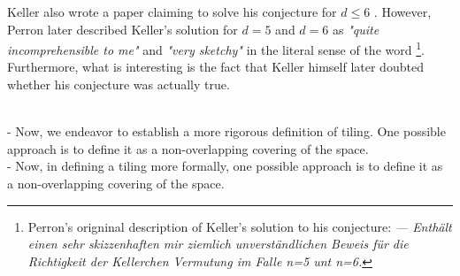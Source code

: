 \documentclass[../thesis.tex]{subfiles}
\begin{document}
\begin{remark}
    Keller also wrote a paper claiming to solve his conjecture for $d\leq 6$ \cite{Keller1937}. However, Perron later described Keller's solution for $d=5$ and $d=6$ as \emph{"quite incomprehensible to me"} and \emph{"very sketchy"} in the literal sense of the word \cite{perronUeberLueckenloseAusfuellung1940} \footnote[1]{Perron's origninal description of Keller's solution to his conjecture: \emph{— Enthält einen sehr skizzenhaften mir ziemlich unverständlichen Beweis für die Richtigkeit der Kellerchen Vermutung im Falle n=5 unt n=6.}}. Furthermore, what is interesting is the fact that Keller himself later doubted whether his conjecture was actually true.
\end{remark}
\\
- Now, we endeavor to establish a more rigorous definition of tiling. One possible approach is to define it as a non-overlapping covering of the space.\\
- Now, in defining a tiling more formally, one possible approach is to define it as a non-overlapping covering of the space.\\ 
\end{document}
